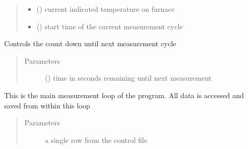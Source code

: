 \documentclass[letterpaper,10pt,english]{sphinxmanual}
\begin{document}
\begin{fulllineitems}
\begin{fulllineitems}
\begin{quote}
\begin{description}
\begin{itemize}
\item {} 
 () \textendash{} current indicated temperature on furnace

\item {} 
 (\sphinxstyleliteralemphasis{\sphinxupquote{ (}}\sphinxstyleliteralemphasis{\sphinxupquote{(}}\sphinxstyleliteralemphasis{\sphinxupquote{)}}\sphinxstyleliteralemphasis{\sphinxupquote{)}}) \textendash{} start time of the current measurement cycle

\end{itemize}

\end{description}\end{quote}

\end{fulllineitems}


\begin{fulllineitems}
\label{\detokenize{laboratory:laboratory.Setup._count_down}}
Controls the count down until next measurement cycle
\begin{quote}\begin{description}
\item[{Parameters}] \leavevmode
{} () \textendash{} time in seconds remaining until next measurement

\end{description}\end{quote}

\end{fulllineitems}


\begin{fulllineitems}
\label{\detokenize{laboratory:laboratory.Setup._measurement_loop}}
This is the main measurement loop of the program. All data is accessed and saved from within this loop
\begin{quote}\begin{description}
\item[{Parameters}] \leavevmode
{} \textendash{} a single row from the control file


\end{description}
\end{quote}
\end{fulllineitems}
\end{fulllineitems}
\end{document}
